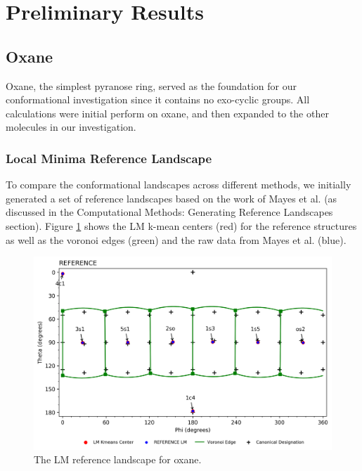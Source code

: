 \documentclass{article}
\begin{document}
\newpage
\section{Preliminary Results}

\subsection{Oxane}
Oxane, the simplest pyranose ring, served as the foundation for our conformational investigation since it contains no exo-cyclic groups. All 
calculations were initial perform on oxane, and then expanded to the other molecules in our investigation.

\subsubsection{Local Minima Reference Landscape}
To compare the conformational landscapes across different methods, we initially generated a set of reference landscapes based on the work
of Mayes et al. (as discussed in the Computational Methods: Generating Reference Landscapes section). Figure \ref{fig:oxane-ref-LM} shows 
the LM k-mean centers (red) for the reference structures as well as the voronoi edges (green) and the raw data from Mayes et al. (blue). 

\begin{figure}[h!]
  	\centering
  	\includegraphics[width=\textwidth,height=\textheight,keepaspectratio]
	{figures/oxane/overall/z_dataset-oxane-LM-REFERENCE-all_groupings.png}
	\caption{The LM reference landscape for oxane.}
 	\label{fig:oxane-ref-LM}
\end{figure}
\end{document}
